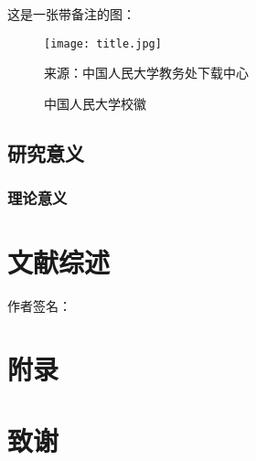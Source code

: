 \documentclass[12pt,UTF8]{ctexart}
\begin{document}
\begin{spacing}{1.25}
这是一张带备注的图：
\begin{figure}[H]
    \centering
    \texttt{[image: title.jpg]}
    \caption{中国人民大学校徽}
    \label{fig:age}
    {\fontsize{8pt}{10pt}\selectfont\parbox{0.7\textwidth}{来源：中国人民大学教务处下载中心}}
\end{figure}
\subsection{研究意义}
\subsubsection{理论意义}

\section{文献综述}

\vspace*{\fill}
\begin{flushright}
    \heiti \large 作者签名：\dunderline[-10pt]{1pt}{\makebox[38mm][c]{}}
  \end{flushright}
\newpage
\end{spacing}
\nocite{*}
\printbibliography[heading=bibliography,title=参考文献]
\newpage
{}
\section*{附录}
\appendix
\newpage
{}
\section*{致谢}
\end{document}
